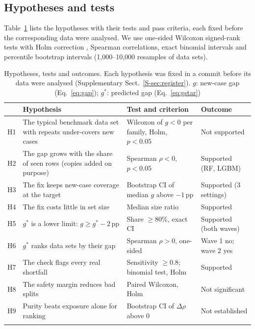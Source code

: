 \subsection{Hypotheses and tests}
Table~\ref{tab:hyp} lists the hypotheses with their tests and pass criteria, each fixed before the corresponding data were analysed. We use one-sided Wilcoxon signed-rank tests \citep{wilcoxon1945} with Holm correction \citep{holm1979}, Spearman correlations, exact binomial intervals and percentile bootstrap intervals (1,000--10,000 resamples of data sets).

\begin{table}[!htbp]
\caption{Hypotheses, tests and outcomes. Each hypothesis was fixed in a commit before its data were analysed (Supplementary Sect.~\ref{S-sec:register}). $g$: new-case gap (Eq.~\ref{eq:gap}); $g^*$: predicted gap (Eq.~\ref{eq:gstar})}\label{tab:hyp}
\centering\footnotesize
\setlength{\tabcolsep}{3pt}
\begin{tabularx}{\textwidth}{@{}lXXp{2.3cm}@{}}
\toprule
 & Hypothesis & Test and criterion & Outcome\\
\midrule
H1 & The typical benchmark data set with repeats under-covers new cases & Wilcoxon of $g<0$ per family, Holm, $p<0.05$ & Not supported\\
H2 & The gap grows with the share of seen rows (copies added on purpose) & Spearman $\rho<0$, $p<0.05$ & Supported (RF, LGBM)\\
H3 & The fix keeps new-case coverage at the target & Bootstrap CI of median $g$ above $-1$\,pp & Supported (3 settings)\\
H4 & The fix costs little in set size & Median size ratio & Supported\\
H5 & $g^*$ is a lower limit: $g\ge g^*-2$\,pp & Share $\ge$80\%, exact CI & Supported (both waves)\\
H6 & $g^*$ ranks data sets by their gap & Spearman $\rho>0$, one-sided & Wave 1 no; wave 2 yes\\
H7 & The check flags every real shortfall & Sensitivity $\ge$0.8; binomial test, Holm & Supported\\
H8 & The safety margin reduces bad splits & Paired Wilcoxon, Holm & Not significant\\
H9 & Purity beats exposure alone for ranking & Bootstrap CI of $\Delta\rho$ above 0 & Not established\\
\botrule
\end{tabularx}
\end{table}
